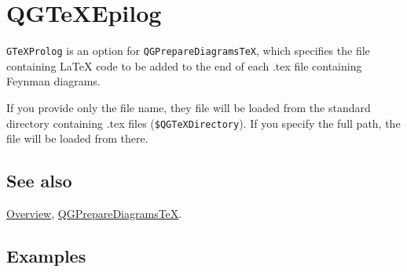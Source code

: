 \documentclass[../FeynHelpersManual.tex]{subfiles}
\begin{document}
\hypertarget{qgtexepilog}{
\section{QGTeXEpilog}\label{qgtexepilog}}

\texttt{GTeXProlog} is an option for \texttt{QGPrepareDiagramsTeX},
which specifies the file containing LaTeX code to be added to the end of
each .tex file containing Feynman diagrams.

If you provide only the file name, they file will be loaded from the
standard directory containing .tex files (\texttt{\$QGTeXDirectory}). If
you specify the full path, the file will be loaded from there.

\subsection{See also}

\hyperlink{toc}{Overview},
\hyperlink{qgpreparediagramstex}{QGPrepareDiagramsTeX}.

\subsection{Examples}
\end{document}
